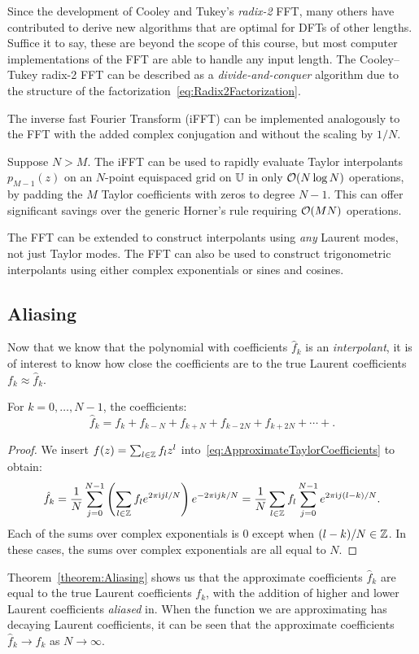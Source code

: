 Since the development of Cooley and Tukey's {\em radix-2} FFT, many others have contributed to derive new algorithms that are optimal for DFTs of other lengths. Suffice it to say, these are beyond the scope of this course, but most computer implementations of the FFT are able to handle any input length. The Cooley--Tukey radix-2 FFT can be described as a {\em divide-and-conquer} algorithm due to the structure of the factorization~\eqref{eq:Radix2Factorization}.

The inverse fast Fourier Transform (iFFT) can be implemented analogously to the FFT with the added complex conjugation and without the scaling by $1/N$.

\begin{example}
Suppose $N>M$. The iFFT can be used to rapidly evaluate Taylor interpolants $p_{M-1}(z)$ on an $N$-point equispaced grid on $\mathbb{U}$ in only $\mathcal{O}(N\log N)$ operations, by padding the $M$ Taylor coefficients with zeros to degree $N-1$. This can offer significant savings over the generic Horner's rule requiring $\mathcal{O}(MN)$ operations.
\end{example}

\begin{remark}
The FFT can be extended to construct interpolants using {\em any} Laurent modes, not just Taylor modes. The FFT can also be used to construct trigonometric interpolants using either complex exponentials or sines and cosines.
\end{remark}

\subsection{Aliasing}

Now that we know that the polynomial with coefficients $\hat{f}_k$ is an {\em interpolant}, it is of interest to know how close the coefficients are to the true Laurent coefficients $f_k\approx\hat{f}_k$.
\begin{theorem}\label{theorem:Aliasing}
For $k=0,\ldots,N-1$, the coefficients:
\[
\hat{f}_k = f_k + f_{k-N} + f_{k+N} + f_{k-2N} + f_{k+2N} +\cdots+.
\]
\end{theorem}
\begin{proof}
We insert $f(z) = \sum_{l\in\mathbb{Z}} f_l z^l$ into~\eqref{eq:ApproximateTaylorCoefficients} to obtain:
\[
\hat{f}_k = \dfrac{1}{N}\sum_{j=0}^{N-1} \left(\sum_{l\in\mathbb{Z}}f_le^{2\pi{\rm i} jl/N}\right)e^{-2\pi{\rm i} jk/N} = \dfrac{1}{N}\sum_{l\in\mathbb{Z}}f_l\sum_{j=0}^{N-1} e^{2\pi{\rm i} j(l-k)/N}.
\]
Each of the sums over complex exponentials is $0$ except when $(l-k)/N\in\mathbb{Z}$. In these cases, the sums over complex exponentials are all equal to $N$.
\end{proof}
Theorem~\ref{theorem:Aliasing} shows us that the approximate coefficients $\hat{f}_k$ are equal to the true Laurent coefficients $f_k$, with the addition of higher and lower Laurent coefficients {\em aliased} in. When the function we are approximating has decaying Laurent coefficients, it can be seen that the approximate coefficients $\hat{f}_k\to f_k$ as $N\to\infty$.

